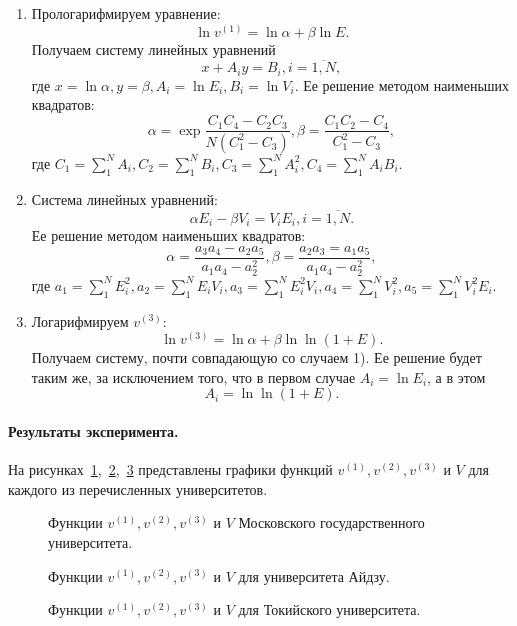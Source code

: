\begin{enumerate}
	\item Прологарифмируем уравнение: \[\ln v^{(1)} = \ln \alpha + \beta \ln E .\] Получаем систему линейных уравнений \[x + A_i y = B_i, i = \overline{1,N} ,\] где \(x = \ln \alpha, y = \beta, A_i = \ln E_i, B_i = \ln V_i\). Ее решение методом наименьших квадратов: \[\alpha = \exp \frac{C_1C_4 - C_2C_3}{N(C_1^2 - C_3)}, \beta = \frac{C_1C_2 - C_4}{C_1^2 - C_3},\] где \(C_1 = \sum_{1}^{N}A_i, C_2 = \sum_{1}^{N}B_i, C_3 = \sum_{1}^{N}A_i^2, C_4 = \sum_{1}^{N}A_i B_i\).
	\item Система линейных уравнений: \[\alpha E_i - \beta V_i = V_i E_i, i = \overline{1,N}.\] Ее решение методом наименьших квадратов: \[\alpha = \frac{a_3 a_4 - a_2 a_5}{a_1 a_4 - a_2^2}, \beta = \frac{a_2 a_3 = a_1 a_5}{a_1 a_4 - a_2^2}, \] где \(a_1 = \sum_{1}^{N} E_i^2, a_2 = \sum_{1}^{N} E_i V_i, a_3 = \sum_{1}^{N} E_i^2 V_i, a_4 = \sum_{1}^{N} V_i^2, a_5 = \sum_{1}^{N} V_i^2 E_i\).
	\item Логарифмируем \(v^{(3)}\): \[\ln v^{(3)} = \ln \alpha + \beta \ln \ln (1 + E).\] Получаем систему, почти совпадающую со случаем 1). Ее решение будет таким же, за исключением того, что в первом случае \(A_i = \ln E_i\), а в этом \[A_i = \ln \ln (1+E).\]
\end{enumerate}

\paragraph{Результаты эксперимента.} На рисунках~\cref{fig:msuFunc},~\cref{fig:aizuFunc},~\cref{fig:tuniFunc} представлены графики функций \(v^{(1)}, v^{(2)}, v^{(3)}\) и \(V\) для каждого из перечисленных университетов.

\begin{figure}[ht]
	\caption{Функции \(v^{(1)}, v^{(2)}, v^{(3)}\) и \(V\) Московского государственного университета.}\label{fig:msuFunc}
\end{figure}

\begin{figure}[ht]
	\caption{Функции \(v^{(1)}, v^{(2)}, v^{(3)}\) и \(V\) для университета Айдзу.}\label{fig:aizuFunc}
\end{figure}

\begin{figure}[ht]
	\caption{Функции \(v^{(1)}, v^{(2)}, v^{(3)}\) и \(V\) для Токийского университета.}\label{fig:tuniFunc}
\end{figure}

